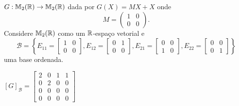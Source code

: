 \documentclass[12pt]{exam}
\begin{document}
\begin{exercicio}
    $G : \mathbb{M}_2(\mathbb{R}) \to \mathbb{M}_2(\mathbb{R})$ dada por $G(X) = MX + X$ onde
    \[
    M = \begin{pmatrix}
        1 & 0\\
        0 & 0
    \end{pmatrix}.
    \]
    Considere $\mathbb{M}_2(\mathbb{R})$ como um $\mathbb{R}$-espaço vetorial e
    \[
    \mathcal{B} = \left\{E_{11} = \begin{bmatrix}
        1 & 0\\0 & 0
    \end{bmatrix}, E_{12} = \begin{bmatrix}
        0 & 1\\0 & 0
    \end{bmatrix}, E_{21} = \begin{bmatrix}
        0 & 0\\1 & 0
    \end{bmatrix}, E_{22} = \begin{bmatrix}
        0 & 0\\0 & 1
    \end{bmatrix}\right\}
    \]
    uma base ordenada.

    \begin{solucao}
        $[G]_\mathcal{B} = \begin{bmatrix}
            2 & 0 & 1 & 1\\
            0 & 2 & 0 & 0\\
            0 & 0 & 0 & 0\\
            0 & 0 & 0 & 0
        \end{bmatrix}$
    \end{solucao}
\end{exercicio}
\end{document}
